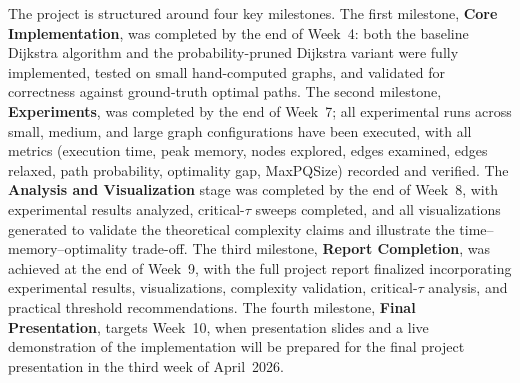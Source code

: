The project is structured around four key milestones. The first milestone, \textbf{Core Implementation}, was completed by the end of Week~4: both the baseline Dijkstra algorithm and the probability-pruned Dijkstra variant were fully implemented, tested on small hand-computed graphs, and validated for correctness against ground-truth optimal paths. The second milestone, \textbf{Experiments}, was completed by the end of Week~7; all experimental runs across small, medium, and large graph configurations have been executed, with all metrics (execution time, peak memory, nodes explored, edges examined, edges relaxed, path probability, optimality gap, MaxPQSize) recorded and verified. The \textbf{Analysis and Visualization} stage was completed by the end of Week~8, with experimental results analyzed, critical-$\tau$ sweeps completed, and all visualizations generated to validate the theoretical complexity claims and illustrate the time--memory--optimality trade-off. The third milestone, \textbf{Report Completion}, was achieved at the end of Week~9, with the full project report finalized incorporating experimental results, visualizations, complexity validation, critical-$\tau$ analysis, and practical threshold recommendations. The fourth milestone, \textbf{Final Presentation}, targets Week~10, when presentation slides and a live demonstration of the implementation will be prepared for the final project presentation in the third week of April~2026.
